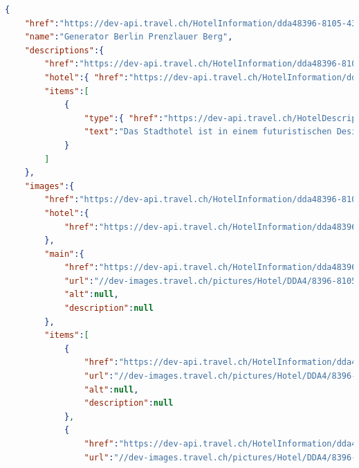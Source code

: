 \begin{lstlisting}[language=json,firstnumber=1]
{
    "href":"https://dev-api.travel.ch/HotelInformation/dda48396-8105-433d-b75b-668f96ec89d8",
    "name":"Generator Berlin Prenzlauer Berg",
    "descriptions":{
        "href":"https://dev-api.travel.ch/HotelInformation/dda48396-8105-433d-b75b-668f96ec89d8/Descriptions",
        "hotel":{ "href":"https://dev-api.travel.ch/HotelInformation/dda48396-8105-433d-b75b-668f96ec89d8" },
        "items":[
            {
                "type":{ "href":"https://dev-api.travel.ch/HotelDescriptionType/Hotel" },
                "text":"Das Stadthotel ist in einem futuristischen Design erbaut und befindet sich in der Naehe der Berlin Arena und der S-Bahnstation Landsberger Allee, nur sechs Strassenbahnhaltestellen vom Alexanderplatz entfernt. Das stilvolle Hostel verfuegt ueber farbenfrohe Zimmer mit Schliessfach und eigenem Bad bzw. Gemeinschaftsbad und die Bar organisiert taegliche Veranstaltungen und woechentliche Partys. Darueber hinaus werden Karaoke-Abende, Filmvorfuehrungen und kostenlose Wanderungen angeboten. Dieses Hostel verspricht einen einzigartigen und unvergesslichen Aufenthalt."
            }
        ]
    },
    "images":{
        "href":"https://dev-api.travel.ch/HotelInformation/dda48396-8105-433d-b75b-668f96ec89d8/ImageGallery",
        "hotel":{
            "href":"https://dev-api.travel.ch/HotelInformation/dda48396-8105-433d-b75b-668f96ec89d8"
        },
        "main":{
            "href":"https://dev-api.travel.ch/HotelInformation/dda48396-8105-433d-b75b-668f96ec89d8/Image/SG90ZWxcRERBNFw4Mzk2LTgxMDUtNDMzRC1CNzVCLTY2OEY5NkVDODlEOFwwMTU5NzVhX2hiX2JhXzAxMi5qcGc=",
            "url":"//dev-images.travel.ch/pictures/Hotel/DDA4/8396-8105-433D-B75B-668F96EC89D8/015975a_hb_ba_012.jpg",
            "alt":null,
            "description":null
        },
        "items":[
            {
                "href":"https://dev-api.travel.ch/HotelInformation/dda48396-8105-433d-b75b-668f96ec89d8/Image/SG90ZWxcRERBNFw4Mzk2LTgxMDUtNDMzRC1CNzVCLTY2OEY5NkVDODlEOFwwMTU5NzVhX2hiX2JhXzAxMi5qcGc=",
                "url":"//dev-images.travel.ch/pictures/Hotel/DDA4/8396-8105-433D-B75B-668F96EC89D8/015975a_hb_ba_012.jpg",
                "alt":null,
                "description":null
            },
            {
                "href":"https://dev-api.travel.ch/HotelInformation/dda48396-8105-433d-b75b-668f96ec89d8/Image/SG90ZWxcRERBNFw4Mzk2LTgxMDUtNDMzRC1CNzVCLTY2OEY5NkVDODlEOFwwMTU5NzVhX2hiX2xfMDA5LmpwZw==",
                "url":"//dev-images.travel.ch/pictures/Hotel/DDA4/8396-8105-433D-B75B-668F96EC89D8/015975a_hb_l_009.jpg",

\end{lstlisting}
